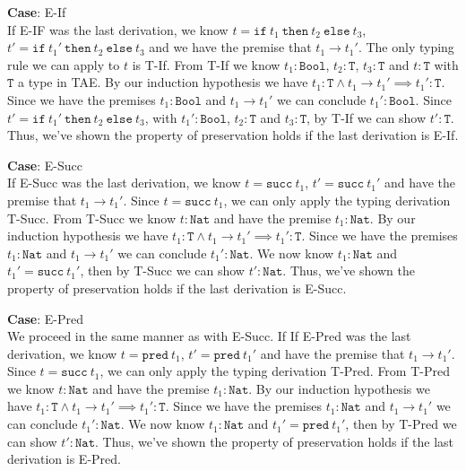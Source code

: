 \documentclass[12pt, fleqn]{article}
\begin{document}
\medskip
\textbf{Case}: E-If\\
If E-IF was the last derivation, we know $t = \texttt{if}\:t_1\:\texttt{then}\:t_2\:\texttt{else}\:t_3$, 
$t' = \texttt{if}\:t_1'\:\texttt{then}\:t_2\:\texttt{else}\:t_3$ and we have the premise that $t_1 \rightarrow t_1'$.
The only typing rule we can apply to $t$ is T-If. From T-If we know $t_1 : \texttt{Bool}$, $t_2 : \texttt{T}$,
$t_3 : \texttt{T}$ and $t : \texttt{T}$ with $\texttt{T}$ a type in TAE. By our induction hypothesis we have
$t_1 : \texttt{T} \land t_1 \rightarrow t_1' \implies t_1' : \texttt{T}$. Since we have the premises $t_1 : \texttt{Bool}$
and $t_1 \rightarrow t_1'$ we can conclude $t_1' : \texttt{Bool}$. Since $t' = \texttt{if}\:t_1'\:\texttt{then}
\:t_2\:\texttt{else}\:t_3$, with $t_1' : \texttt{Bool}$, $t_2 : \texttt{T}$ and $t_3 : \texttt{T}$, by T-If we can
show $t' : \texttt{T}$.
Thus, we've shown the property of preservation holds if the last derivation is E-If.


\medskip
\textbf{Case}: E-Succ\\
If E-Succ was the last derivation, we know $t = \texttt{succ}\:t_1$, $t' = \texttt{succ}\:t_1'$ and have the
premise that $t_1 \rightarrow t_1'$. Since $t = \texttt{succ}\:t_1$, we can only apply the typing derivation
T-Succ. From T-Succ we know $t : \texttt{Nat}$ and have the premise $t_1 : \texttt{Nat}$. By our induction
hypothesis we have $t_1 : \texttt{T} \land t_1 \rightarrow t_1' \implies t_1' : \texttt{T}$. Since we have the premises
$t_1 : \texttt{Nat}$ and $t_1 \rightarrow t_1'$ we can conclude $t_1' : \texttt{Nat}$. We now know $t_1 : \texttt{Nat}$
and $t_1' = \texttt{succ}\:t_1'$, then by T-Succ we can show $t' : \texttt{Nat}$.
Thus, we've shown the property of preservation holds if the last derivation is E-Succ.

\medskip
\textbf{Case}: E-Pred\\
We proceed in the same manner as with E-Succ. If 
If E-Pred was the last derivation, we know $t = \texttt{pred}\:t_1$, $t' = \texttt{pred}\:t_1'$ and have the
premise that $t_1 \rightarrow t_1'$. Since $t = \texttt{succ}\:t_1$, we can only apply the typing derivation
T-Pred. From T-Pred we know $t : \texttt{Nat}$ and have the premise $t_1 : \texttt{Nat}$. By our induction
hypothesis we have $t_1 : \texttt{T} \land t_1 \rightarrow t_1' \implies t_1' : \texttt{T}$. Since we have the premises
$t_1 : \texttt{Nat}$ and $t_1 \rightarrow t_1'$ we can conclude $t_1' : \texttt{Nat}$. We now know $t_1 : \texttt{Nat}$
and $t_1' = \texttt{pred}\:t_1'$, then by T-Pred we can show $t' : \texttt{Nat}$.
Thus, we've shown the property of preservation holds if the last derivation is E-Pred.
\end{document}
